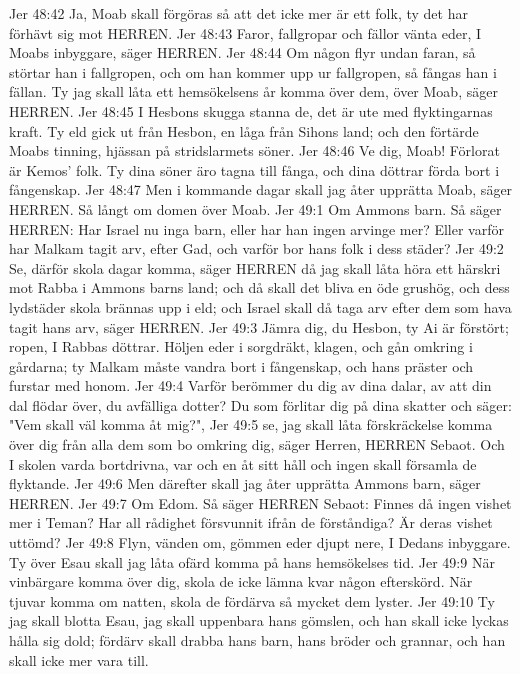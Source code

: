 Jer 48:42  Ja, Moab skall förgöras så att det icke mer är ett folk, ty det har förhävt sig mot HERREN.
Jer 48:43  Faror, fallgropar och fällor vänta eder, I Moabs inbyggare, säger HERREN.
Jer 48:44  Om någon flyr undan faran, så störtar han i fallgropen, och om han kommer upp ur fallgropen, så fångas han i fällan. Ty jag skall låta ett hemsökelsens år komma över dem, över Moab, säger HERREN.
Jer 48:45  I Hesbons skugga stanna de, det är ute med flyktingarnas kraft. Ty eld gick ut från Hesbon, en låga från Sihons land; och den förtärde Moabs tinning, hjässan på stridslarmets söner.
Jer 48:46  Ve dig, Moab! Förlorat är Kemos' folk. Ty dina söner äro tagna till fånga, och dina döttrar förda bort i fångenskap.
Jer 48:47  Men i kommande dagar skall jag åter upprätta Moab, säger HERREN. Så långt om domen över Moab.
Jer 49:1  Om Ammons barn. Så säger HERREN: Har Israel nu inga barn, eller har han ingen arvinge mer? Eller varför har Malkam tagit arv, efter Gad, och varför bor hans folk i dess städer?
Jer 49:2  Se, därför skola dagar komma, säger HERREN då jag skall låta höra ett härskri mot Rabba i Ammons barns land; och då skall det bliva en öde grushög, och dess lydstäder skola brännas upp i eld; och Israel skall då taga arv efter dem som hava tagit hans arv, säger HERREN.
Jer 49:3  Jämra dig, du Hesbon, ty Ai är förstört; ropen, I Rabbas döttrar. Höljen eder i sorgdräkt, klagen, och gån omkring i gårdarna; ty Malkam måste vandra bort i fångenskap, och hans präster och furstar med honom.
Jer 49:4  Varför berömmer du dig av dina dalar, av att din dal flödar över, du avfälliga dotter? Du som förlitar dig på dina skatter och säger: "Vem skall väl komma åt mig?",
Jer 49:5  se, jag skall låta förskräckelse komma över dig från alla dem som bo omkring dig, säger Herren, HERREN Sebaot. Och I skolen varda bortdrivna, var och en åt sitt håll och ingen skall församla de flyktande.
Jer 49:6  Men därefter skall jag åter upprätta Ammons barn, säger HERREN.
Jer 49:7  Om Edom. Så säger HERREN Sebaot: Finnes då ingen vishet mer i Teman? Har all rådighet försvunnit ifrån de förståndiga? Är deras vishet uttömd?
Jer 49:8  Flyn, vänden om, gömmen eder djupt nere, I Dedans inbyggare. Ty över Esau skall jag låta ofärd komma på hans hemsökelses tid.
Jer 49:9  När vinbärgare komma över dig, skola de icke lämna kvar någon efterskörd. När tjuvar komma om natten, skola de fördärva så mycket dem lyster.
Jer 49:10  Ty jag skall blotta Esau, jag skall uppenbara hans gömslen, och han skall icke lyckas hålla sig dold; fördärv skall drabba hans barn, hans bröder och grannar, och han skall icke mer vara till.
